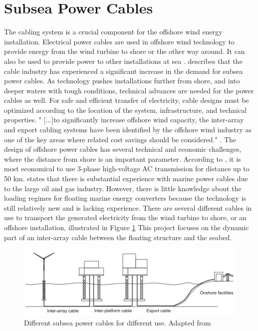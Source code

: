\section{Subsea Power Cables}
 The cabling system is a crucial component for the offshore wind energy installation. Electrical power cables are used in offshore wind technology to provide energy from the wind turbine to shore or the other way around. It can also be used to provide power to other installations at sea \cite{Nasution2013}.  \cite{srinil2016} describes that the cable industry has experienced a significant increase in the demand for subsea power cables. As technology pushes installations further from shore, and into deeper waters with tough conditions, technical advances are needed for the power cables as well. For safe and efficient transfer of electricity, cable designs must be optimized according to the location of the system, infrastructure, and technical properties. " [...]to significantly increase offshore wind capacity, the inter-array and export cabling systems have been identified by the offshore wind industry as one of the key areas where related cost savings should be considered."  \cite{srinil2016}. The design of offshore power cables has several technical and economic challenges, where the distance from shore is an important parameter. According to \cite{Lynn2011}, it is most economical to use 3-phase high-voltage AC transmission for distance up to 50 km.\newline
 \newline
 \cite{Thies2012} states that there is substantial experience with marine power cables due to the large oil and gas industry. However, there is little knowledge about the loading regimes for floating marine energy converters because the technology is still relatively new and is lacking experience. 
 \newline
 \newline
 There are several different cables in use to transport the generated electricity from the wind turbine to shore, or an offshore installation, illustrated in Figure \ref{fig:diffcable} This project focuses on the dynamic part of an inter-array cable between the floating structure and the seabed. 
 
 \begin{figure}[H]
\centering
\includegraphics[scale=0.8]{figures/diffcable}
\caption[$\; \:$Different subsea power cable]{Different subsea power cables for different use. Adapted from   \cite{srinil2016} }
 \label{fig:diffcable}
\end{figure}


